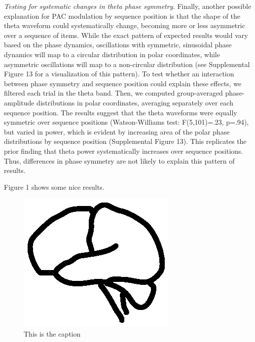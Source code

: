 \emph{Testing for systematic changes in theta phase symmetry.} Finally,
another possible explanation for PAC modulation by sequence position is
that the shape of the theta waveform could systematically change,
becoming more or less asymmetric over a sequence of items. While the
exact pattern of expected results would vary based on the phase
dynamics, oscillations with symmetric, sinusoidal phase dynamics will
map to a circular distribution in polar coordinates, while asymmetric
oscillations will map to a non-circular distribution (see Supplemental
Figure 13 for a visualization of this pattern). To test whether an
interaction between phase symmetry and sequence position could explain
these effects, we filtered each trial in the theta band. Then, we
computed group-averaged phase-amplitude distributions in polar
coordinates, averaging separately over each sequence position. The
results suggest that the theta waveforms were equally symmetric over
sequence positions (Watson-Williams test: F(5,101)=.23, p=.94), but
varied in power, which is evident by increasing area of the polar phase
distributions by sequence position (Supplemental Figure 13). This
replicates the prior finding that theta power systematically increases
over sequence positions. Thus, differences in phase symmetry are not
likely to explain this pattern of results.

Figure 1 shows some nice results.

\begin{figure}[htbp]
\centering
\includegraphics{figures/figure1}
\caption{This is the caption}
\end{figure}
